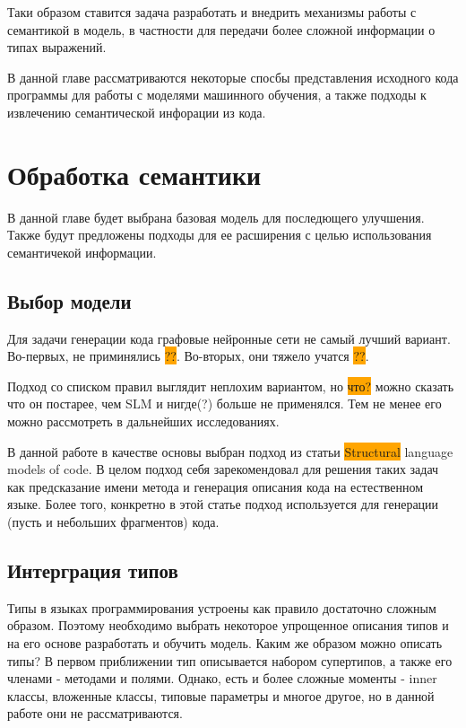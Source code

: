 \documentclass[times,specification,annotation]{itmo-student-thesis}
\begin{document}
Таки образом ставится задача разработать и внедрить механизмы работы с семантикой в модель, в частности для передачи более сложной информации о типах выражений.

\chapterconclusion
В данной главе рассматриваются некоторые спосбы представления исходного кода программы для работы с моделями машинного обучения, а также подходы к извлечению семантической инфорации из кода.


\chapter{Обработка семантики}

В данной главе будет выбрана базовая модель для последющего улучшения. Также будут предложены подходы для ее расширения с целью использования семантичекой информации.

\section{Выбор модели}\label{sec:chooseModel}
Для задачи генерации кода графовые нейронные сети не самый лучший вариант. Во-первых, не приминялись \colorbox{orange}{??}. Во-вторых, они тяжело учатся \colorbox{orange}{??}.

Подход со списком правил выглядит неплохим вариантом, но \colorbox{orange}{что?} можно сказать что он постарее, чем SLM и нигде(?) больше не применялся. Тем не менее его можно рассмотреть в дальнейших исследованиях.

В данной работе в качестве основы выбран подход из статьи \colorbox{orange}{Structural} language models of code. В целом подход себя зарекомендовал для решения таких задач как предсказание имени метода и генерация описания кода на естественном языке. Более того, конкретно в этой статье подход используется для генерации (пусть и небольших фрагментов) кода.

\section{Интерграция типов}\label{typeIntro}
Типы в языках программирования устроены как правило достаточно сложным образом. Поэтому необходимо выбрать некоторое упрощенное описания типов и на его основе разработать и обучить модель. Каким же образом можно описать типы? В первом приближении тип описывается набором супертипов, а также его членами - методами и полями. Однако, есть и более сложные моменты - inner классы, вложенные классы, типовые параметры и многое другое, но в данной работе они не рассматриваются.
\end{document}
